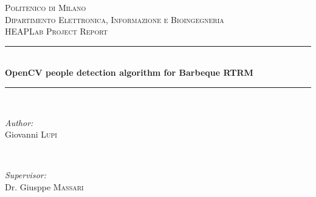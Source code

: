 \begin{titlepage}

\newcommand{\HRule}{\rule{\linewidth}{0.5mm}} %

\center %
 

\textsc{\LARGE Politenico di Milano}\\[1.5cm] %
\textsc{\Large Dipartimento Elettronica, Informazione e Bioingegneria}\\[0.5cm] %
\textsc{\large HEAPLab Project Report}\\[0.5cm] %


\HRule \\[0.4cm]
{ \huge \bfseries OpenCV people detection algorithm for Barbeque RTRM}\\[0.4cm] %
\HRule \\[1.5cm]
 

\begin{minipage}{0.4\textwidth}
\begin{flushleft} \large
\emph{Author:}\\
Giovanni \textsc{Lupi} %
\end{flushleft}
\end{minipage}
~
\begin{minipage}{0.4\textwidth}
\begin{flushright} \large
\emph{Supervisor:} \\
Dr. Giusppe \textsc{Massari} %
\end{flushright}
\end{minipage}\\[2cm]



\end{titlepage}
